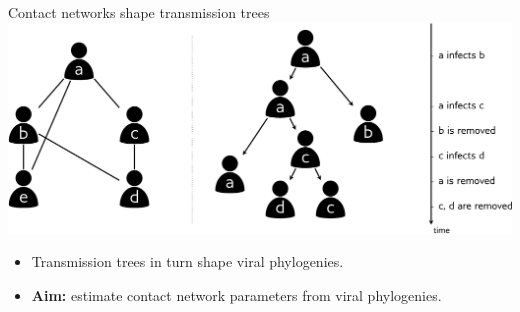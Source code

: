\documentclass{beamer}
\begin{document}
\begin{frame}{Contact networks shape transmission trees}
  \includegraphics[width=\textwidth]{contactnet}

  \begin{itemize}
      \pause
    \item Transmission trees in turn shape viral phylogenies.
      \pause
    \item \textbf{Aim:} estimate contact network parameters from viral
      phylogenies.
  \end{itemize}
\end{frame}

\end{document}
